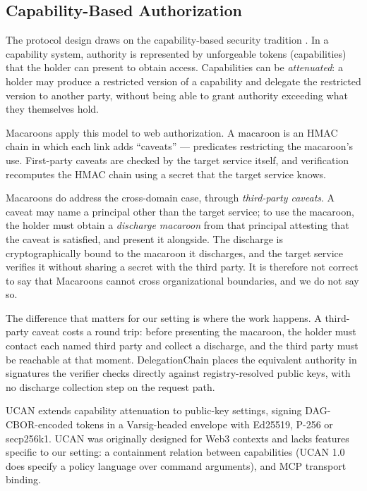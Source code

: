 \documentclass[11pt,a4paper]{article}
\begin{document}
\subsection{Capability-Based Authorization}
\label{sec:bg-capabilities}

The protocol design draws on the capability-based security tradition
\citep{miller2006robust}. In a capability system, authority is represented
by unforgeable tokens (capabilities) that the holder can present to obtain
access. Capabilities can be \emph{attenuated}: a holder may produce a
restricted version of a capability and delegate the restricted version to
another party, without being able to grant authority exceeding what they
themselves hold.

Macaroons \citep{birgisson2014macaroons} apply this model to web
authorization. A macaroon is an HMAC chain in which each link adds
``caveats'' --- predicates restricting the macaroon's use. First-party
caveats are checked by the target service itself, and verification
recomputes the HMAC chain using a secret that the target service knows.

Macaroons do address the cross-domain case, through \emph{third-party
caveats}. A caveat may name a principal other than the target service;
to use the macaroon, the holder must obtain a \emph{discharge macaroon}
from that principal attesting that the caveat is satisfied, and present
it alongside. The discharge is cryptographically bound to the macaroon
it discharges, and the target service verifies it without sharing a
secret with the third party. It is therefore not correct to say that
Macaroons cannot cross organizational boundaries, and we do not say so.

The difference that matters for our setting is where the work happens.
A third-party caveat costs a round trip: before presenting the macaroon,
the holder must contact each named third party and collect a discharge,
and the third party must be reachable at that moment. DelegationChain
places the equivalent authority in signatures the verifier checks
directly against registry-resolved public keys, with no discharge
collection step on the request path.

UCAN \citep{ucan-spec} extends capability attenuation to public-key
settings, signing DAG-CBOR-encoded tokens in a Varsig-headed envelope
with Ed25519, P-256 or secp256k1.
UCAN was originally designed for Web3 contexts and lacks features specific to our
setting: a containment relation between capabilities (UCAN 1.0 does
specify a policy language over command arguments), and MCP transport
binding.
\end{document}
